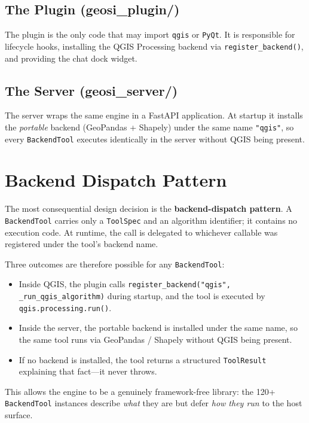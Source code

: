 \documentclass[12pt,a4paper]{report}
\begin{document}
\subsection{The Plugin (geosi\_plugin/)}

The plugin is the only code that may import \texttt{qgis} or \texttt{PyQt}.  It is responsible for lifecycle hooks, installing the QGIS Processing backend via \texttt{register\_backend()}, and providing the chat dock widget.

\subsection{The Server (geosi\_server/)}

The server wraps the same engine in a FastAPI application.  At startup it installs the \emph{portable} backend (GeoPandas + Shapely) under the same name \texttt{"qgis"}, so every \texttt{BackendTool} executes identically in the server without QGIS being present.

\section{Backend Dispatch Pattern}

The most consequential design decision is the \textbf{backend-dispatch pattern}.  A \texttt{BackendTool} carries only a \texttt{ToolSpec} and an algorithm identifier; it contains no execution code.  At runtime, the call is delegated to whichever callable was registered under the tool's backend name.

Three outcomes are therefore possible for any \texttt{BackendTool}:

\begin{itemize}
  \item Inside QGIS, the plugin calls \texttt{register\_backend("qgis", \_run\_qgis\_algorithm)} during startup, and the tool is executed by \texttt{qgis.processing.run()}.
  \item Inside the server, the portable backend is installed under the same name, so the same tool runs via GeoPandas / Shapely without QGIS being present.
  \item If no backend is installed, the tool returns a structured \texttt{ToolResult} explaining that fact---it never throws.
\end{itemize}

This allows the engine to be a genuinely framework-free library: the 120+ \texttt{BackendTool} instances describe \emph{what} they are but defer \emph{how they run} to the host surface.
\end{document}
